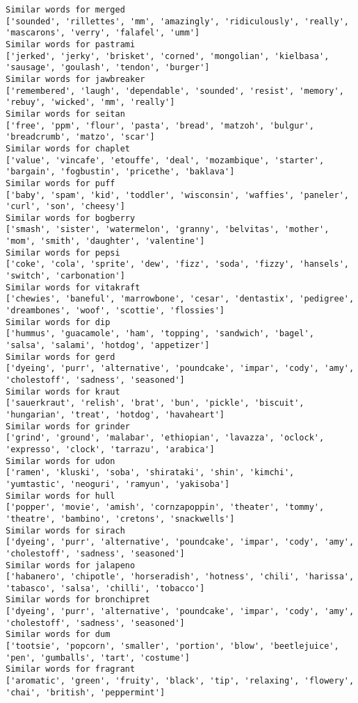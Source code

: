\documentclass[11pt]{article}
\begin{document}
\begin{Verbatim}[commandchars=\\\{\}]
Similar words for merged
['sounded', 'rillettes', 'mm', 'amazingly', 'ridiculously', 'really', 'mascarons', 'verry', 'falafel', 'umm']
Similar words for pastrami
['jerked', 'jerky', 'brisket', 'corned', 'mongolian', 'kielbasa', 'sausage', 'goulash', 'tendon', 'burger']
Similar words for jawbreaker
['remembered', 'laugh', 'dependable', 'sounded', 'resist', 'memory', 'rebuy', 'wicked', 'mm', 'really']
Similar words for seitan
['free', 'ppm', 'flour', 'pasta', 'bread', 'matzoh', 'bulgur', 'breadcrumb', 'matzo', 'scar']
Similar words for chaplet
['value', 'vincafe', 'etouffe', 'deal', 'mozambique', 'starter', 'bargain', 'fogbustin', 'pricethe', 'baklava']
Similar words for puff
['baby', 'spam', 'kid', 'toddler', 'wisconsin', 'waffies', 'paneler', 'curl', 'son', 'cheesy']
Similar words for bogberry
['smash', 'sister', 'watermelon', 'granny', 'belvitas', 'mother', 'mom', 'smith', 'daughter', 'valentine']
Similar words for pepsi
['coke', 'cola', 'sprite', 'dew', 'fizz', 'soda', 'fizzy', 'hansels', 'switch', 'carbonation']
Similar words for vitakraft
['chewies', 'baneful', 'marrowbone', 'cesar', 'dentastix', 'pedigree', 'dreambones', 'woof', 'scottie', 'flossies']
Similar words for dip
['hummus', 'guacamole', 'ham', 'topping', 'sandwich', 'bagel', 'salsa', 'salami', 'hotdog', 'appetizer']
Similar words for gerd
['dyeing', 'purr', 'alternative', 'poundcake', 'impar', 'cody', 'amy', 'cholestoff', 'sadness', 'seasoned']
Similar words for kraut
['sauerkraut', 'relish', 'brat', 'bun', 'pickle', 'biscuit', 'hungarian', 'treat', 'hotdog', 'havaheart']
Similar words for grinder
['grind', 'ground', 'malabar', 'ethiopian', 'lavazza', 'oclock', 'expresso', 'clock', 'tarrazu', 'arabica']
Similar words for udon
['ramen', 'kluski', 'soba', 'shirataki', 'shin', 'kimchi', 'yumtastic', 'neoguri', 'ramyun', 'yakisoba']
Similar words for hull
['popper', 'movie', 'amish', 'cornzapoppin', 'theater', 'tommy', 'theatre', 'bambino', 'cretons', 'snackwells']
Similar words for sirach
['dyeing', 'purr', 'alternative', 'poundcake', 'impar', 'cody', 'amy', 'cholestoff', 'sadness', 'seasoned']
Similar words for jalapeno
['habanero', 'chipotle', 'horseradish', 'hotness', 'chili', 'harissa', 'tabasco', 'salsa', 'chilli', 'tobacco']
Similar words for bronchipret
['dyeing', 'purr', 'alternative', 'poundcake', 'impar', 'cody', 'amy', 'cholestoff', 'sadness', 'seasoned']
Similar words for dum
['tootsie', 'popcorn', 'smaller', 'portion', 'blow', 'beetlejuice', 'pen', 'gumballs', 'tart', 'costume']
Similar words for fragrant
['aromatic', 'green', 'fruity', 'black', 'tip', 'relaxing', 'flowery', 'chai', 'british', 'peppermint']

\end{Verbatim}
\end{document}
